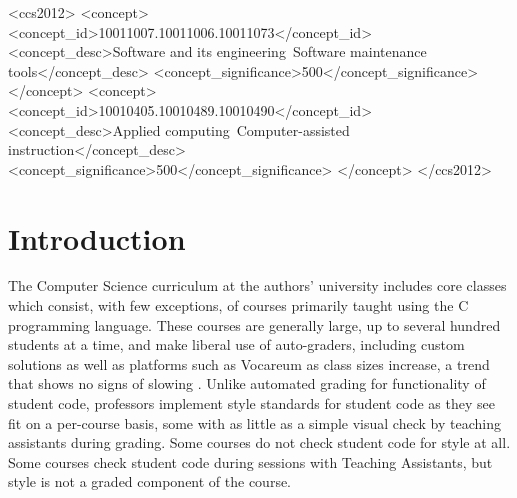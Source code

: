 \documentclass[sigconf]{acmart}
\begin{document}
\begin{CCSXML}
<ccs2012>
    <concept>
    <concept_id>10011007.10011006.10011073</concept_id>
    <concept_desc>Software and its engineering~Software maintenance tools</concept_desc>
    <concept_significance>500</concept_significance>
    </concept>
    <concept>
    <concept_id>10010405.10010489.10010490</concept_id>
    <concept_desc>Applied computing~Computer-assisted instruction</concept_desc>
    <concept_significance>500</concept_significance>
    </concept>
</ccs2012>
\end{CCSXML}



\maketitle

\section{Introduction}
The Computer Science curriculum at the authors' university includes core classes which
consist, with few exceptions, of courses primarily taught using the C programming
language. These courses are generally large, up to several hundred students at a time,
and make liberal use of auto-graders, including custom solutions as well as platforms
such as Vocareum as class sizes increase, a trend that shows no signs of slowing
\cite{10.1145/2839509.2844616}. Unlike automated grading for functionality of student
code, professors implement style standards for student code as they see fit on a
per-course basis, some with as little as a simple visual check by teaching assistants
during grading. Some courses do not check student code for style at all. Some courses
check student code during sessions with Teaching Assistants, but style is not a graded
component of the course.
\\
\end{document}
